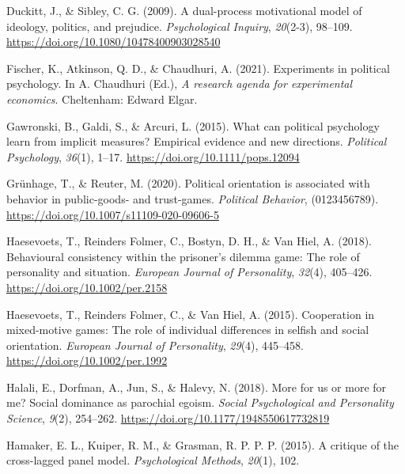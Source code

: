 \documentclass[
  man,floatsintext]{apa6}
\newlength{\cslhangindent}
\newlength{\cslentryspacingunit} %
\newenvironment{CSLReferences}[2] %
 {%
  \setlength{\parindent}{0pt}
  \ifodd #1
  \let\oldpar\par
  \def\par{\hangindent=\cslhangindent\oldpar}
  \fi
  \setlength{\parskip}{#2\cslentryspacingunit}
 }%
 {}
\begin{document}
\begin{CSLReferences}{1}{0}
\leavevmode{}%
Duckitt, J., \& Sibley, C. G. (2009). A dual-process motivational model of ideology, politics, and prejudice. \emph{Psychological Inquiry}, \emph{20}(2-3), 98--109. \url{https://doi.org/10.1080/10478400903028540}

\leavevmode{}%
Fischer, K., Atkinson, Q. D., \& Chaudhuri, A. (2021). Experiments in political psychology. In A. Chaudhuri (Ed.), \emph{A research agenda for experimental economics}. Cheltenham: Edward Elgar.

\leavevmode{}%
Gawronski, B., Galdi, S., \& Arcuri, L. (2015). What can political psychology learn from implicit measures? Empirical evidence and new directions. \emph{Political Psychology}, \emph{36}(1), 1--17. \url{https://doi.org/10.1111/pops.12094}

\leavevmode{}%
Grünhage, T., \& Reuter, M. (2020). Political orientation is associated with behavior in public-goods- and trust-games. \emph{Political Behavior}, (0123456789). \url{https://doi.org/10.1007/s11109-020-09606-5}

\leavevmode{}%
Haesevoets, T., Reinders Folmer, C., Bostyn, D. H., \& Van Hiel, A. (2018). Behavioural consistency within the prisoner's dilemma game: The role of personality and situation. \emph{European Journal of Personality}, \emph{32}(4), 405--426. \url{https://doi.org/10.1002/per.2158}

\leavevmode{}%
Haesevoets, T., Reinders Folmer, C., \& Van Hiel, A. (2015). Cooperation in mixed-motive games: The role of individual differences in selfish and social orientation. \emph{European Journal of Personality}, \emph{29}(4), 445--458. \url{https://doi.org/10.1002/per.1992}

\leavevmode{}%
Halali, E., Dorfman, A., Jun, S., \& Halevy, N. (2018). More for us or more for me? Social dominance as parochial egoism. \emph{Social Psychological and Personality Science}, \emph{9}(2), 254--262. \url{https://doi.org/10.1177/1948550617732819}

\leavevmode{}%
Hamaker, E. L., Kuiper, R. M., \& Grasman, R. P. P. P. (2015). A critique of the cross-lagged panel model. \emph{Psychological Methods}, \emph{20}(1), 102.


\end{CSLReferences}
\end{document}
